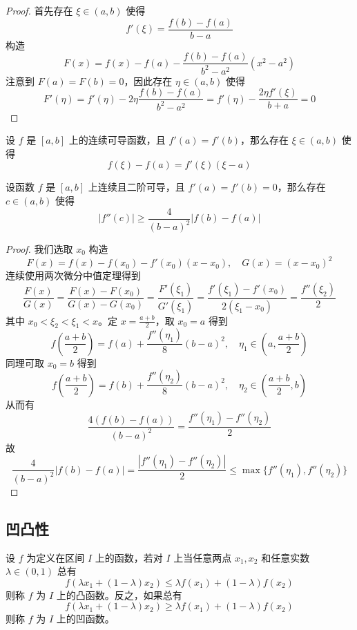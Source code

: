 \begin{proof}
	首先存在 $\xi \in (a,b)$ 使得
	\[ f'(\xi) = \frac{f(b) - f(a)}{b - a} \]
	构造
	\[ F(x) = f(x) - f(a) - \frac{f(b) - f(a)}{b^2 - a^2}(x^2 - a^2) \]
	注意到 $F(a) = F(b) = 0$，因此存在 $\eta \in (a, b)$ 使得
	\[ F'(\eta) = f'(\eta) - 2 \eta \frac{f(b) - f(a)}{b^2 - a^2} = f'(\eta) - \frac{2 \eta f'(\xi)}{b + a} = 0 \] 
\end{proof}

\begin{proposition}
	设 $f$ 是 $[a,b]$ 上的连续可导函数，且 $f'(a) = f'(b)$，那么存在 $\xi \in (a,b)$ 使得
	\[ f(\xi) - f(a) = f'(\xi)(\xi - a) \]
\end{proposition}

\begin{proposition}
	设函数 $f$ 是 $[a,b]$ 上连续且二阶可导，且 $f'(a) = f'(b) = 0$，那么存在 $c \in (a,b)$ 使得
	\[ |f''(c)| \geqslant \frac{4}{(b-a)^2} |f(b) - f(a)| \]
\end{proposition}

\begin{proof}
	我们选取 $x_0$ 构造
	\[ F(x) = f(x) - f(x_0) - f'(x_0)(x-x_0) , \quad G(x) = (x-x_0)^2 \]
	连续使用两次微分中值定理得到
	\[ \frac{F(x)}{G(x)} = \frac{F(x) - F(x_0)}{G(x) - G(x_0)} = \frac{F'(\xi_1)}{G'(\xi_1)} = \frac{f'(\xi_1) - f'(x_0)}{2 (\xi_1 - x_0)} = \frac{f''(\xi_2)}{2} \]
	其中 $x_0 < \xi_2 < \xi_1 < x$。定 $x=\frac{a+b}{2}$，取 $x_0 = a$ 得到
	\[ f\left(\frac{a+b}{2}\right) = f(a) + \frac{f''(\eta_1)}{8} (b-a)^2, \quad \eta_1 \in \left(a, \frac{a+b}{2}\right) \]
	同理可取 $x_0 = b$ 得到
	\[ f\left(\frac{a+b}{2}\right) = f(b) + \frac{f''(\eta_2)}{8} (b-a)^2, \quad \eta_2 \in \left(\frac{a+b}{2}, b\right) \]
	从而有
	\[ \frac{4(f(b) - f(a))}{(b-a)^2} = \frac{f''(\eta_1) - f''(\eta_2)}{2} \]
	故
	\[ \frac{4}{(b-a)^2}|f(b) - f(a)| = \frac{|f''(\eta_1) - f''(\eta_2)|}{2} \leqslant \max\{f''(\eta_1), f''(\eta_2)\} \]
\end{proof}

\subsection{凹凸性}

\begin{definition}
	设 $f$ 为定义在区间 $I$ 上的函数，若对 $I$ 上当任意两点 $x_1,x_2$ 和任意实数 $\lambda\in (0,1)$ 总有
	\[ f(\lambda x_1+(1-\lambda)x_2) \leqslant \lambda f(x_1)+(1-\lambda)f(x_2) \]
	则称 $f$ 为 $I$ 上的凸函数。反之，如果总有
	\[ f(\lambda x_1+(1-\lambda)x_2) \geqslant \lambda f(x_1)+(1-\lambda)f(x_2) \]
	则称 $f$ 为 $I$ 上的凹函数。
\end{definition}

